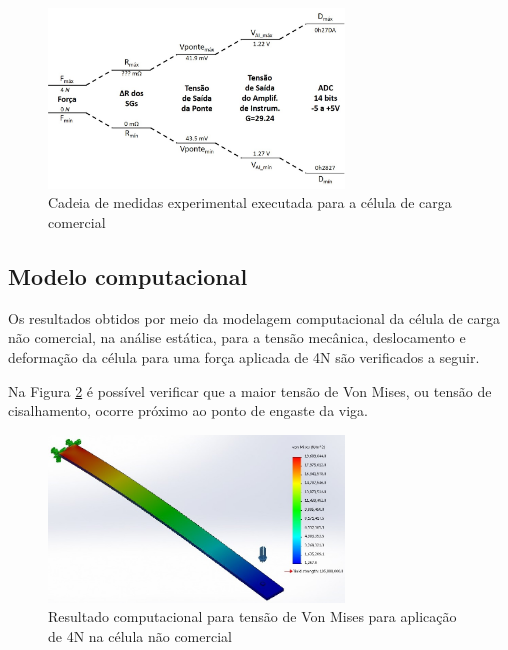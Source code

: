 \documentclass[a4paper]{instrumentacao}
\begin{document}
\begin{figure}[H]
\center
\includegraphics[width=0.7\textwidth]{CadeiaMedidasExperimental_CelulaNaoComercial.jpg}
\caption{Cadeia de medidas experimental executada para a célula de carga comercial}
\label{fig:celula-nao-comercial-cadeia-medidas-experimental}
\end{figure}

\subsection{Modelo computacional}

Os resultados obtidos por meio da modelagem computacional da célula de carga não comercial, na análise estática, para a tensão mecânica, deslocamento e deformação da célula para uma força aplicada de 4N são verificados a seguir.

Na Figura \ref{fig:celula-nao-comercial-computacional-tensao} é possível verificar que a maior tensão de Von Mises, ou tensão de cisalhamento, ocorre próximo ao ponto de engaste da viga.

\begin{figure}[H]
\center
\includegraphics[width=0.7\textwidth]{CelulaNaoComercial_solid_tensao.jpg}
\caption{Resultado computacional para tensão de Von Mises para aplicação de 4N na célula não comercial}
\label{fig:celula-nao-comercial-computacional-tensao}
\end{figure}
\end{document}
